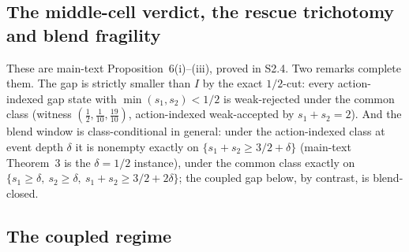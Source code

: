 \documentclass[preprint,11pt,authoryear]{elsarticle}
\theoremstyle{remark}
\begin{document}
\subsection{The middle-cell verdict, the rescue trichotomy and blend fragility}

These are main-text Proposition~6(i)--(iii), proved in S2.4. Two remarks complete them. The gap is strictly smaller than $I$ by the exact $1/2$-cut: every action-indexed gap state with $\min(s_1,s_2)<1/2$ is weak-rejected under the common class (witness $(\tfrac12,\tfrac1{10},\tfrac{19}{10})$, action-indexed weak-accepted by $s_1+s_2=2$). And the blend window is class-conditional in general: under the action-indexed class at event depth $\delta$ it is nonempty exactly on $\{s_1+s_2\ge3/2+\delta\}$ (main-text Theorem~3 is the $\delta=1/2$ instance), under the common class exactly on $\{s_1\ge\delta,\ s_2\ge\delta,\ s_1+s_2\ge3/2+2\delta\}$; the coupled gap below, by contrast, is blend-closed.

\subsection{The coupled regime}
\end{document}
